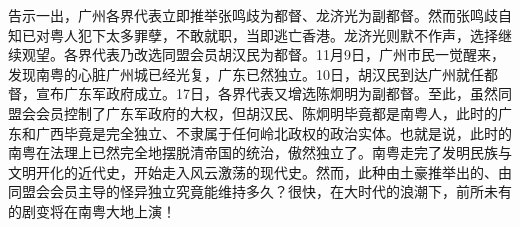 告示一出，广州各界代表立即推举张鸣歧为都督、龙济光为副都督。然而张鸣歧自知已对粤人犯下太多罪孽，不敢就职，当即逃亡香港。龙济光则默不作声，选择继续观望。各界代表乃改选同盟会员胡汉民为都督。11月9日，广州市民一觉醒来，发现南粤的心脏广州城已经光复，广东已然独立。10日，胡汉民到达广州就任都督，宣布广东军政府成立。17日，各界代表又增选陈炯明为副都督。至此，虽然同盟会会员控制了广东军政府的大权，但胡汉民、陈炯明毕竟都是南粤人，此时的广东和广西毕竟是完全独立、不隶属于任何岭北政权的政治实体。也就是说，此时的南粤在法理上已然完全地摆脱清帝国的统治，傲然独立了。南粤走完了发明民族与文明开化的近代史，开始走入风云激荡的现代史。然而，此种由土豪推举出的、由同盟会会员主导的怪异独立究竟能维持多久？很快，在大时代的浪潮下，前所未有的剧变将在南粤大地上演！


